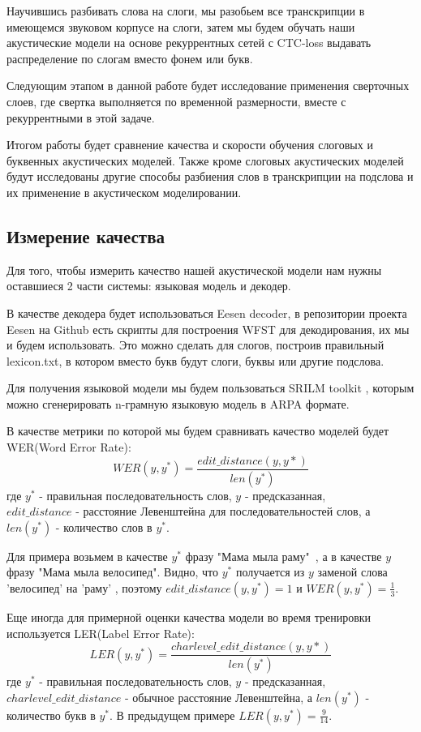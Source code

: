 \documentclass[a4paper,14pt]{extarticle}
\begin{document}
Научившись разбивать слова на слоги, мы разобьем все транскрипции в имеющемся звуковом корпусе на слоги, затем мы будем обучать наши акустические модели на основе рекуррентных сетей с CTC-loss выдавать распределение по слогам вместо фонем или букв.

Следующим этапом в данной работе будет исследование применения сверточных слоев, где
свертка выполняется по временной размерности, вместе с рекуррентными в этой задаче.

Итогом работы будет сравнение качества и скорости обучения слоговых и буквенных акустических моделей. Также кроме слоговых акустических моделей будут исследованы другие способы разбиения слов в транскрипции на подслова и их применение в акустическом моделировании.

\subsection{Измерение качества}
Для того, чтобы измерить качество нашей акустической модели нам нужны оставшиеся 2 части системы: языковая модель и декодер.

В качестве декодера будет использоваться Eesen decoder\cite{DBLP:journals/corr/MiaoGM15}, в репозитории проекта Eesen на Github есть скрипты для построения WFST для декодирования, их мы и будем использовать. Это можно сделать для слогов, построив правильный lexicon.txt, в котором вместо букв будут слоги, буквы или другие подслова.

Для получения языковой модели мы будем пользоваться  SRILM toolkit \cite{stolcke2002srilm}, которым можно сгенерировать n-грамную  языковую модель в ARPA формате.

В качестве метрики по которой мы будем сравнивать качество моделей будет WER(Word Error Rate):
$$WER(y, y^*) =\frac{edit\_distance(y, y*)}{len(y^*)} $$ где $y^*$ - правильная последовательность слов, $y$ - предсказанная, \\ $edit\_distance$ - расстояние Левенштейна для последовательностей слов, а $len(y^*)$ - количество слов в $y^*$.

Для примера возьмем в качестве $y^*$ фразу "Мама мыла раму"\ , а в качестве $y$ фразу "Мама мыла велосипед".
Видно, что $y^*$ получается из $y$ заменой слова 'велосипед' на 'раму' , поэтому $edit\_distance(y, y^*) = 1$ и $WER(y, y^*) = \frac{1}{3}$.

Еще иногда для примерной оценки качества модели во время тренировки используется LER(Label Error Rate):$$LER(y, y^*) =\frac{charlevel\_edit\_distance(y, y*)}{len(y^*)} $$  где $y^*$ - правильная последовательность слов, $y$ - предсказанная, \\ $charlevel\_edit\_distance$ - обычное расстояние Левенштейна, а $len(y^*)$ - количество букв в $y^*$.
В предыдущем примере $LER(y, y^*) = \frac{9}{14}$.
\end{document}
